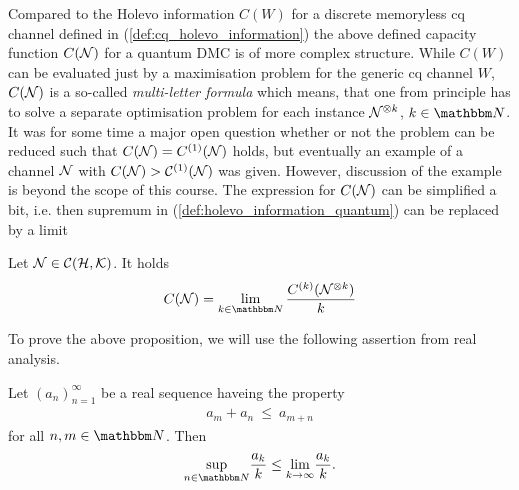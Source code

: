 	Compared to the Holevo information $C(W)$ for a discrete memoryless cq channel defined in (\ref{def:cq_holevo_information}) the above defined capacity function $C({\mathcal N})$ for a quantum DMC is of more complex structure. While $C(W)$ can be evaluated just by a maximisation problem for the generic cq channel $W$, $C({\mathcal N})$ is a so-called \emph{multi-letter formula}  which means, that one from principle has to solve a separate optimisation problem for each instance ${\mathcal N}^{\otimes k}$, $k \in \bbmN$. It was for some time a major open question whether or not the problem can be reduced such that $C({\mathcal N}) =  C^{(1)}({\mathcal N})$ holds, but eventually an example of a channel ${\mathcal N}$ with $C({\mathcal N}) > {\mathcal C}^{(1)}({\mathcal N})$ was given. However, discussion of the example is beyond the scope of this course. The expression for $C({\mathcal N})$ can be simplified a bit, i.e. then supremum in 
	(\ref{def:holevo_information_quantum}) can be replaced by a limit
	\begin{proposition}\label{prop:fekete_application}
	 Let ${\mathcal N} \in {\mathcal C}({\mathcal H}, {\mathcal K})$. It holds 
	 \begin{align*}
	 C(\cN) = \lim_{k \in \bbmN} \frac{C^{(k)}(\cN^{\otimes k})}{k}
	 \end{align*}
	\end{proposition}
	To prove the above proposition, we will use the following assertion from real analysis. 	
      \begin{lemma}
      Let $(a_n)_{n=1}^\infty$ be a real sequence haveing the property
      \begin{align*}
       a_m + a_n \ \leq \ a_{m+n}
      \end{align*}
      for all $n,m \in \bbmN$. Then 
      \begin{align*}
       \underset{n \in \bbmN}{\sup} \frac{a_k}{k} \leq \underset{k \rightarrow \infty}{\lim} \frac{a_k}{k}.
      \end{align*}
     \end{lemma}

